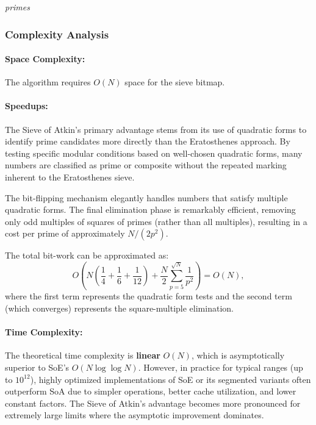 \documentclass{article}
\begin{document}
\begin{algorithm}[H]
\begin{algorithmic}[1]
            \State {}
                    \State {}
                \EndIf
            \EndFor

            \State {}
            \State \Return \emph{primes}
        \EndProcedure
    \end{algorithmic}
\end{algorithm}

\subsubsection*{Complexity Analysis}

\paragraph{Space Complexity:} The algorithm requires $O(N)$ space for the sieve bitmap.

\paragraph{Speedups:} 
The Sieve of Atkin's primary advantage stems from its use of quadratic forms to identify prime candidates more directly than the Eratosthenes approach. By testing specific modular conditions based on well-chosen quadratic forms, many numbers are classified as prime or composite without the repeated marking inherent to the Eratosthenes sieve.

The bit-flipping mechanism elegantly handles numbers that satisfy multiple quadratic forms. The final elimination phase is remarkably efficient, removing only odd multiples of squares of primes (rather than all multiples), resulting in a cost per prime of approximately $N/(2p^2)$.

The total bit-work can be approximated as:
\[
O\left(N\left(\frac{1}{4} + \frac{1}{6} + \frac{1}{12}\right) + \frac{N}{2}\sum_{p=5}^{\sqrt N}\frac{1}{p^2}\right) = O(N),
\]
where the first term represents the quadratic form tests and the second term (which converges) represents the square-multiple elimination.

\paragraph{Time Complexity:} The theoretical time complexity is \textbf{linear} $O(N)$, which is asymptotically superior to SoE's $O(N \log \log N)$. However, in practice for typical ranges (up to $10^{12}$), highly optimized implementations of SoE or its segmented variants often outperform SoA due to simpler operations, better cache utilization, and lower constant factors. The Sieve of Atkin's advantage becomes more pronounced for extremely large limits where the asymptotic improvement dominates.
\end{document}
